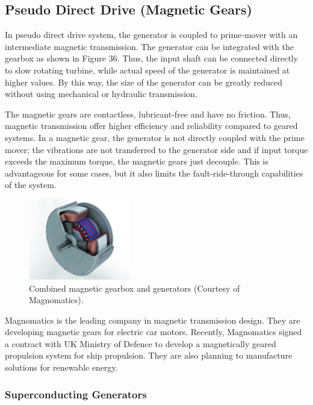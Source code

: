 \documentclass[a4paper, 11pt]{article} %
\begin{document}
\subsection{Pseudo Direct Drive (Magnetic Gears)}

In pseudo direct drive system, the generator is coupled to prime-mover with an intermediate magnetic transmission. The generator can be integrated with the gearbox as shown in Figure 36. Thus, the input shaft can be connected directly to slow rotating turbine, while actual speed of the generator is maintained at higher values. By this way, the size of the generator can be greatly reduced without using mechanical or hydraulic transmission.

The magnetic gears are contactless, lubricant-free and have no friction. Thus, magnetic transmission offer higher efficiency and reliability compared to geared systems. In a magnetic gear, the generator is not directly coupled with the prime mover; the vibrations are not transferred to the generator side and if input torque exceeds the maximum torque, the magnetic gears just decouple. This is advantageous for some cases, but it also limits the fault-ride-through capabilities of the system.

  \begin{figure}[t]
    \centering
    \includegraphics[width=0.4\textwidth]{magnomatics}
    \caption{Combined magnetic gearbox and generators (Courtesy of Magnomatics).} 
    \label{magnomatics}
  \end{figure}


Magnomatics is the leading company in magnetic transmission design. They are developing magnetic gears for electric car motors. Recently, Magnomatics signed a contract with UK Ministry of Defence to develop a magnetically geared propulsion system for ship propulsion. They are also planning to manufacture solutions for renewable energy. 

\subsubsection{Superconducting Generators}
\end{document}
